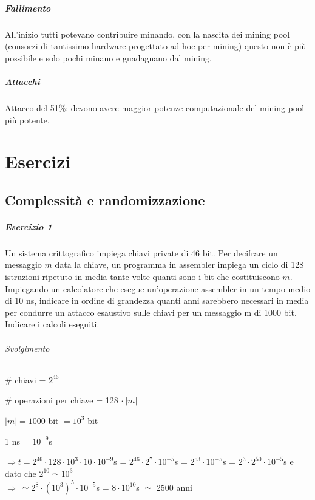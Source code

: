 \documentclass[10pt]{book}
\begin{document}
\paragraph{Fallimento} All'inizio tutti potevano contribuire minando, con la nascita dei mining pool (consorzi di tantissimo hardware progettato ad hoc per mining) questo non è più possibile e solo pochi minano e guadagnano dal mining.
\paragraph{Attacchi} Attacco del 51\%: devono avere maggior potenze computazionale del mining pool più potente.
\chapter{Esercizi}
\section{Complessità e randomizzazione}
\paragraph{Esercizio 1} Un sistema crittografico impiega chiavi private di 46 bit. Per decifrare un messaggio $m$ data la
chiave, un programma in assembler impiega un ciclo di 128 istruzioni ripetuto in media tante volte
quanti sono i bit che costituiscono $m$. Impiegando un calcolatore che esegue un'operazione
assembler in un tempo medio di 10 ns, indicare in ordine di grandezza quanti anni sarebbero
necessari in media per condurre un attacco esaustivo sulle chiavi per un messaggio m di 1000 bit.\\
Indicare i calcoli eseguiti.
\subparagraph{Svolgimento} \begin{list}{}{}
	\item \# chiavi = $2^{46}$
	\item \# operazioni per chiave = 128 $\cdot\:|m|$
	\item $|m| = 1000$ bit $= 10^3$ bit
	\item 1 ns = $10^{-9}$s
	\item $\Rightarrow t = 2^{46}\cdot128\cdot10^3\cdot10\cdot10^{-9}$s = $2^{46}\cdot2^7\cdot10^{-5}$s = $2^{53}\cdot10^{-5}$s = $2^3\cdot2^{50}\cdot10^{-5}$s e dato che $2^{10} \simeq 10^3$\\
	$\Rightarrow\:\simeq 2^8\cdot(10^3)^5\cdot10^{-5}$s = $8\cdot10^{10}$s $\simeq$ 2500 anni
\end{list}
\end{document}
